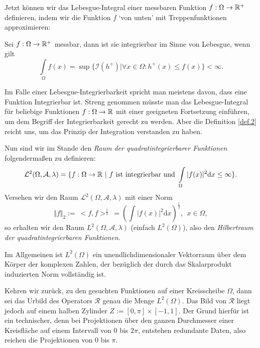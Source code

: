 Jetzt können wir das Lebesgue-Integral einer messbaren Funktion $f: \Omega \rightarrow \mathbb{R}^+$ definieren, indem wir die Funktion $f$ `von unten' mit Treppenfunktionen approximieren:
\begin{Definition}
	Sei  $f: \Omega \rightarrow \mathbb{R}^+$ messbar, dann ist sie integrierbar im Sinne von Lebesgue, wenn gilt
	\[ \int\limits_{\Omega} f(x) = \sup\{ \mathcal{I}(h^+) | \forall x \in \Omega : h^+(x) \leq f(x) \} < \infty.\]
	\label{def.2}
\end{Definition}
\begin{Bemerkung}
	Im Falle einer Lebesgue-Integrierbarkeit spricht man meistens davon, dass eine Funktion Integrierbar ist. Streng genommen müsste man das Lebesgue-Integral für beliebige Funktionen $f:\Omega \rightarrow \mathbb{R}$ mit einer geeigneten Fortsetzung einführen, um dem Begriff der Integrierbarkeit gerecht zu werden. Aber die Definition \ref{def.2} reicht uns, um das Prinzip der Integration verstanden zu haben. 
	\label{bem:2}
\end{Bemerkung}
Nun sind wir im Stande den \textit{Raum der quadratintegrierbarer Funktionen} folgendermaßen zu definieren:
\begin{equation}
	\mathcal{L}^{2}(\Omega, \mathcal{A}, \lambda) = \{ f : \Omega \rightarrow \mathbb{R} \ | \ f \mbox{ ist integrierbar und } \int \limits_{\Omega} |f(x)|^2 \mbox{d}x \leq \infty \}.
	\label{equa:1.13}
\end{equation}
Versehen wir den Raum $\mathcal{L}^{2}(\Omega, \mathcal{A}, \lambda)$ mit einer Norm
\begin{equation}
	\Vert f \Vert_2 := \ < f, f >^{\frac{1}{2}} \ = \left( \int |f(x)|^2 \mbox{d}x \right)^{\frac{1}{2}}, \ \ x \in \Omega,
	\label{equa:1.14}
\end{equation}
so erhalten wir den Raum $L^2(\Omega, \mathcal{A}, \lambda)$ (einfach $L^2(\Omega)$), also den \textit{Hilbertraum der quadratintegrierbaren Funktionen}. 

Im Allgemeinen ist $L^2(\Omega)$ ein unendlichdimensionaler Vektorraum über dem Körper der komplexen Zahlen, der bezüglich der durch das Skalarprodukt induzierten Norm vollständig ist.

Kehren wir zurück, zu den gesuchten Funktionen auf einer Kreisscheibe $\Omega$, dann sei das Urbild des Operators $\mathcal{R}$ genau die Menge $L^2(\Omega)$. Das Bild von $\mathcal{R}$ liegt jedoch auf einem halben Zylinder $Z := [0, \pi] \times [-1,1]$. Der Grund hierfür ist ein technischer, denn bei Projektionen über den ganzen Durchmesser einer Kreisfläche auf einem Intervall von $0$ bis $2\pi$, entstehen redundante Daten, also reichen die Projektionen von $0$ bis $\pi$. 

